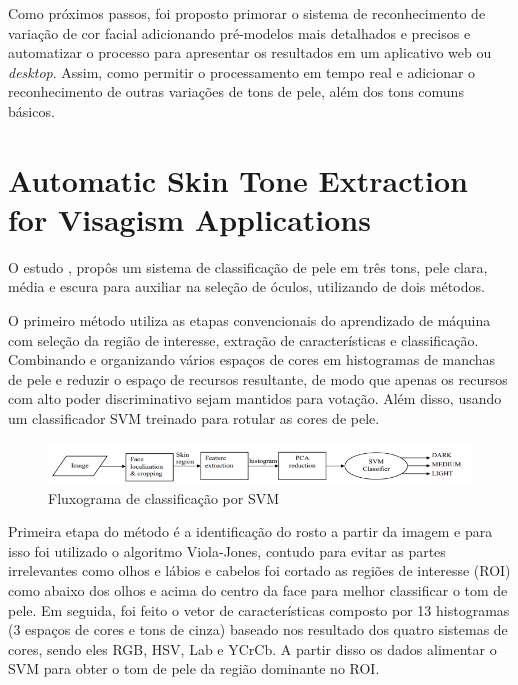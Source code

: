 Como próximos passos, foi proposto primorar o sistema de reconhecimento de variação de cor facial adicionando pré-modelos mais detalhados e precisos e automatizar o processo para apresentar os resultados em um aplicativo web ou \textit{desktop}. Assim, como permitir o processamento em tempo real e adicionar o reconhecimento de outras variações de tons de pele, além dos tons comuns básicos. 

\section{Automatic Skin Tone Extraction for Visagism Applications}
 O estudo \cite{Automatic_Skin_Tone_Extraction_for_Visagism_Applications}, propôs um sistema de classificação de pele em três tons, pele clara, média e escura para auxiliar na seleção de óculos, utilizando de dois métodos.
 
O primeiro método utiliza as etapas convencionais do aprendizado de máquina com seleção da região de interesse, extração de características e classificação. Combinando e organizando vários espaços de cores em histogramas de manchas de pele e reduzir o espaço de recursos resultante, de modo que apenas os recursos com alto poder discriminativo sejam mantidos para votação. Além disso, usando um classificador SVM treinado para rotular as cores de pele.

\begin{figure}[h]
\caption{Fluxograma de classificação por SVM }
\centering

\includegraphics[]{Template_Latex_TCC-UNIFTEC/_lib/imagens/FluxogramaVisagismo.png}

\label{fig:x fluxogama_svm}
\end{figure}

Primeira etapa do método é a identificação do rosto a partir da imagem e para isso foi utilizado o algoritmo Viola-Jones, contudo para evitar as partes irrelevantes como olhos e lábios e cabelos foi cortado as regiões de interesse (ROI) como abaixo dos olhos e acima do centro da face para melhor classificar o tom de pele. Em seguida, foi feito o vetor de características composto por 13 histogramas (3 espaços de cores e tons de cinza) baseado nos resultado dos quatro sistemas de cores, sendo eles RGB, HSV, Lab e YCrCb. A partir disso os dados alimentar o SVM para obter o tom de pele da região dominante no ROI.

